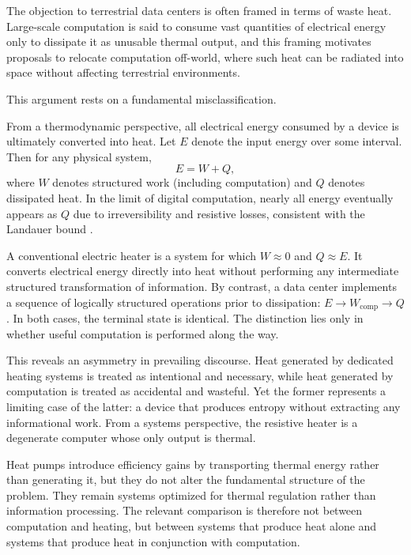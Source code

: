 \documentclass[11pt,a4paper]{article}
\theoremstyle{plain}
\theoremstyle{definition}
\theoremstyle{remark}
\begin{document}
The objection to terrestrial data centers is often framed in terms of waste
heat. Large-scale computation is said to consume vast quantities of electrical
energy only to dissipate it as unusable thermal output, and this framing
motivates proposals to relocate computation off-world, where such heat can be
radiated into space without affecting terrestrial environments.

This argument rests on a fundamental misclassification.

From a thermodynamic perspective, all electrical energy consumed by a device is
ultimately converted into heat. Let $E$ denote the input energy over some
interval. Then for any physical system,
\[
  E = W + Q,
\]
where $W$ denotes structured work (including computation) and $Q$ denotes
dissipated heat. In the limit of digital computation, nearly all energy
eventually appears as $Q$ due to irreversibility and resistive losses,
consistent with the Landauer bound \citep{landauer1961,bennett1982}.

A conventional electric heater is a system for which $W \approx 0$ and
$Q \approx E$. It converts electrical energy directly into heat without
performing any intermediate structured transformation of information. By
contrast, a data center implements a sequence of logically structured operations
prior to dissipation: $E \to W_{\mathrm{comp}} \to Q$. In both cases, the
terminal state is identical. The distinction lies only in whether useful
computation is performed along the way.

This reveals an asymmetry in prevailing discourse. Heat generated by dedicated
heating systems is treated as intentional and necessary, while heat generated by
computation is treated as accidental and wasteful. Yet the former represents a
limiting case of the latter: a device that produces entropy without extracting
any informational work. From a systems perspective, the resistive heater is a
degenerate computer whose only output is thermal.

Heat pumps introduce efficiency gains by transporting thermal energy rather than
generating it, but they do not alter the fundamental structure of the problem.
They remain systems optimized for thermal regulation rather than information
processing. The relevant comparison is therefore not between computation and
heating, but between systems that produce heat alone and systems that produce
heat in conjunction with computation.
\end{document}
